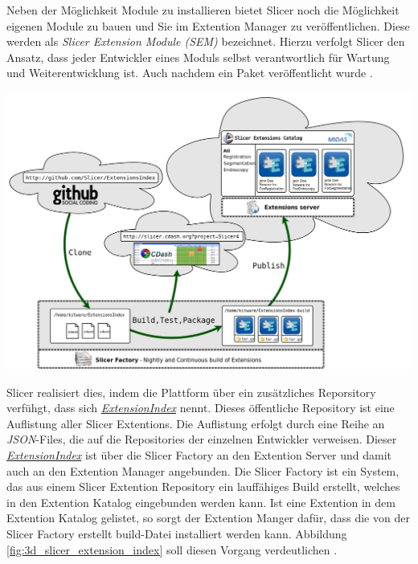 \begin{minipage}{0.30\textwidth}
	Neben der Möglichkeit Module zu installieren bietet Slicer noch die Möglichkeit
	eigenen Module zu bauen und Sie im Extention Manager zu veröffentlichen. Diese
	werden als \textit{Slicer Extension Module (SEM)} bezeichnet. Hierzu verfolgt
	Slicer den Ansatz, dass jeder Entwickler eines Moduls selbst verantwortlich für
	Wartung und Weiterentwicklung ist. Auch nachdem ein Paket veröffentlicht wurde
	\citep{slicer2024}.
\end{minipage}
\hfill
\begin{minipage}{0.60\textwidth}
	\centering
	\includegraphics[width=1\textwidth]{img/slicer_extention_index.png}
	\label{fig:3d_slicer_extension_index}
\end{minipage}

Slicer realisiert dies, indem die Plattform über ein zusätzliches Reporsitory
verfühgt, dass sich \href{https://github.com/Slicer/ExtensionsIndex?tab=readme-ov-file}{\textit{ExtensionIndex}}
nennt. Dieses öffentliche Repository ist eine Auflistung aller Slicer Extentions.
Die Auflistung erfolgt durch eine Reihe an \textit{JSON}-Files, die auf die Repositories
der einzelnen Entwickler verweisen. Dieser
\href{https://github.com/Slicer/ExtensionsIndex?tab=readme-ov-file}{\textit{ExtensionIndex}}
ist über die Slicer Factory an den Extention Server und damit auch an den
Extention Manager angebunden. Die Slicer Factory ist ein System, das aus einem
Slicer Extention Repository ein lauffähiges Build erstellt, welches in den Extention
Katalog eingebunden werden kann. Ist eine Extention in dem Extention Katalog
gelistet, so sorgt der Extention Manger dafür, dass die von der Slicer Factory
erstellt build-Datei installiert werden kann. Abbildung \ref{fig:3d_slicer_extension_index}
soll diesen Vorgang verdeutlichen \citep[vgl.][]{slicer2024}.

